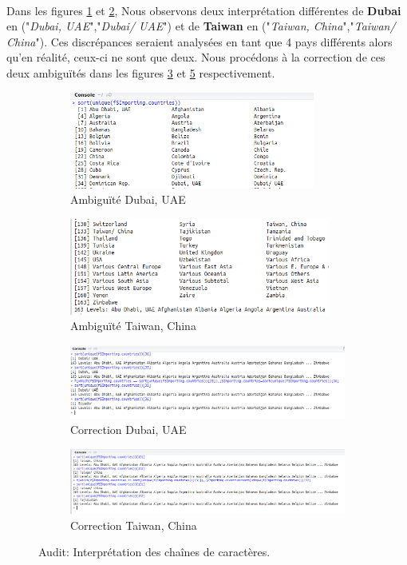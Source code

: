 	\paragraph{}
	Dans les figures \ref{fig:dubai} et \ref{fig:taiwan}, Nous observons deux interprétation différentes de \textbf{Dubai} en ("\textit{Dubai, UAE}","\textit{Dubai/ UAE}") et de \textbf{Taiwan} en ("\textit{Taiwan, China}","\textit{Taiwan/ China}"). Ces discrépances seraient analysées en tant que 4 pays différents alors qu'en réalité, ceux-ci ne sont que deux. Nous procédons à la correction de ces deux ambiguïtés dans les figures \ref{fig:corrDubai} et \ref{fig:corrTaiwan} respectivement.
	\begin{figure}[H]
	\begin{subfigure}{.5\textwidth}
			\centering
			\includegraphics[height=90pt]{4}
			\caption{Ambiguïté Dubai, UAE}
			\label{fig:dubai}
	\end{subfigure}
	\begin{subfigure}{.5\textwidth}
		\centering
		\includegraphics[height=90pt]{5}
		\caption{Ambiguïté Taiwan, China}
		\label{fig:taiwan}
	\end{subfigure}
	\begin{subfigure}{\linewidth}
			\centering
			\includegraphics[width=\linewidth]{6}
			\caption{Correction Dubai, UAE}
			\label{fig:corrDubai}
	\end{subfigure}
	\begin{subfigure}{\linewidth}
			\centering
			\includegraphics[width=\linewidth]{7}
			\caption{Correction Taiwan, China}
			\label{fig:corrTaiwan}
	\end{subfigure}
	\caption{Audit: Interprétation des chaînes de caractères.}
	\end{figure}
	\par
		
